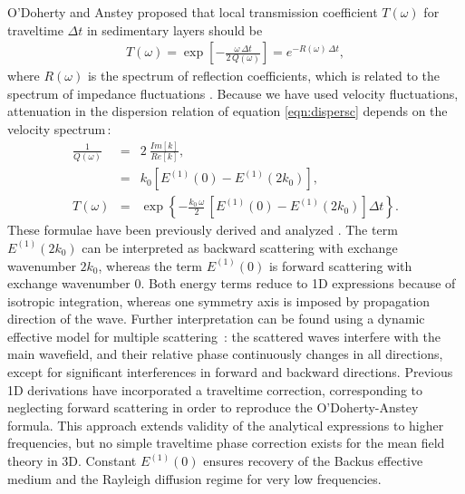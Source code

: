 O'Doherty and Anstey \cite[]{Odoherty_A71,Resnick_90} proposed 
that local transmission coefficient $T(\omega)$ for traveltime $\Delta t$ in sedimentary layers 
should be 
\begin{eqnarray}
T(\omega) = \exp\left[-\frac{\omega\,\Delta t}{2\,Q(\omega)}\right] = e^{-R(\omega)\,\Delta t},
\end{eqnarray}
where $R(\omega)$ is the spectrum of reflection coefficients, which is related to the spectrum
of impedance fluctuations \cite[]{Banik_LS85}.
Because we have used velocity fluctuations, attenuation in the dispersion relation of equation \ref{eqn:dispersc}
depends on the velocity spectrum\,:
\begin{eqnarray}
\frac{1}{Q(\omega)} & = & 2~\frac{Im[k]}{Re[k]}, \\
& = & {k_0}\left[E^{(1)}(0) - E^{(1)}(2k_0)\right], \\
T(\omega)  & = & \exp\left\{-\frac{k_0\,\omega}{2}\,\left[E^{(1)}(0) - E^{(1)}(2k_0)\right]\Delta t\right\}. \label{eqn:rspec}
\end{eqnarray}
These formulae have been previously derived and analyzed \cite[]{Lerche_86,Wu_88,Sato_F98}.
The term $E^{(1)}(2k_0)$ can be interpreted as backward scattering
with exchange wavenumber $2k_0$, whereas the term $E^{(1)}(0)$ is forward scattering
with exchange wavenumber $0$.
Both energy terms reduce to 1D expressions because of isotropic integration, 
whereas one symmetry axis is imposed by propagation direction of the wave.
Further interpretation can be found using a dynamic effective model
for multiple scattering \cite[]{Waterman_T61}\,:
the scattered waves interfere with the main wavefield, 
and their relative phase continuously changes in all directions,
except for significant interferences in forward and backward directions.
Previous 1D derivations \cite[]{Sato_F98}
have incorporated a traveltime correction, corresponding to neglecting forward scattering
in order to reproduce the O'Doherty-Anstey formula. This approach extends validity of the analytical expressions
to higher frequencies, but no simple traveltime phase correction exists for the mean field theory in 3D.
Constant $E^{(1)}(0)$ ensures recovery of the Backus effective medium and the Rayleigh diffusion regime for very low frequencies.


\label{Expohet}


